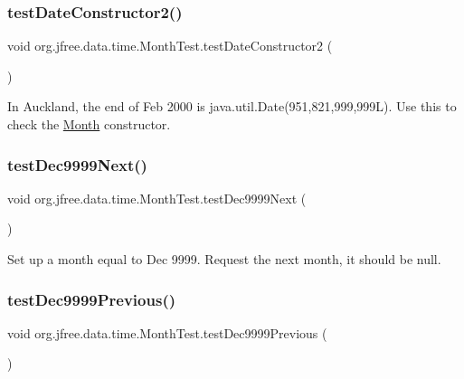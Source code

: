\subsubsection{\texorpdfstring{test\+Date\+Constructor2()}{testDateConstructor2()}}
{\footnotesize\ttfamily void org.\+jfree.\+data.\+time.\+Month\+Test.\+test\+Date\+Constructor2 (\begin{DoxyParamCaption}{ }\end{DoxyParamCaption})}

In Auckland, the end of Feb 2000 is java.\+util.\+Date(951,821,999,999\+L). Use this to check the \mbox{\hyperlink{classorg_1_1jfree_1_1data_1_1time_1_1_month}{Month}} constructor. \mbox{\label{classorg_1_1jfree_1_1data_1_1time_1_1_month_test_a2ddead6dca50c393063102cdc289839f}} 
\subsubsection{\texorpdfstring{test\+Dec9999\+Next()}{testDec9999Next()}}
{\footnotesize\ttfamily void org.\+jfree.\+data.\+time.\+Month\+Test.\+test\+Dec9999\+Next (\begin{DoxyParamCaption}{ }\end{DoxyParamCaption})}

Set up a month equal to Dec 9999. Request the next month, it should be null. \mbox{\label{classorg_1_1jfree_1_1data_1_1time_1_1_month_test_a6ff993007f6f0b8803c7ff0001ddc804}} 
\subsubsection{\texorpdfstring{test\+Dec9999\+Previous()}{testDec9999Previous()}}
{\footnotesize\ttfamily void org.\+jfree.\+data.\+time.\+Month\+Test.\+test\+Dec9999\+Previous (\begin{DoxyParamCaption}{ }\end{DoxyParamCaption})}

